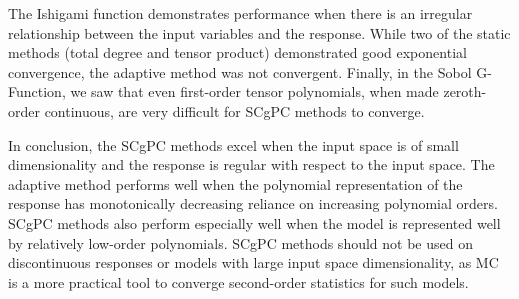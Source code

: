 The Ishigami function demonstrates performance when there is an irregular relationship between the input
variables and the response.  While two of the static methods (total degree and tensor product) demonstrated
good exponential convergence, the adaptive method was not convergent.  Finally, in the Sobol G-Function,
we saw that even first-order tensor polynomials, when made zeroth-order
continuous, are very difficult for SCgPC methods to converge.

In conclusion, the SCgPC methods excel when the input space is of small dimensionality and the response is
regular with respect to the input space.  The adaptive method performs well when the polynomial representation
of the response has monotonically decreasing reliance on increasing polynomial orders.  SCgPC methods also
perform especially well when the model is represented well by relatively low-order polynomials.  SCgPC methods
should not be used on discontinuous responses or models with large input space dimensionality, as MC is a more
practical tool to converge second-order statistics for such models.
